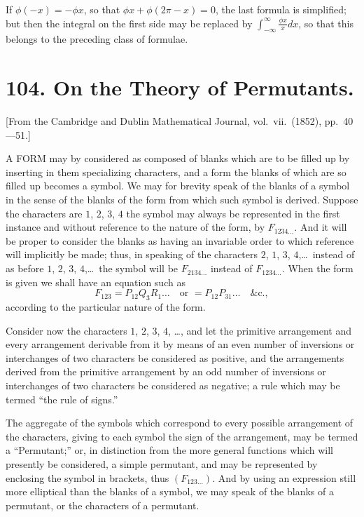 \documentclass[11pt,a4paper]{book}
\begin{document}
If $\phi(-x) = -\phi x$, so that $\phi x + \phi(2\pi - x) = 0$, the last formula is simplified; but then the integral on the first side may be replaced by $\int_{-\infty}^{\infty} \frac{\phi x}{x} dx$, so that this belongs to the preceding class of formulae.
\clearpage


\section*{104. On the Theory of Permutants.}

[From the Cambridge and Dublin Mathematical Journal, vol.\ vii.\ (1852), pp.\ 40---51.]

A FORM may by considered as composed of blanks which are to be filled up by inserting in them specializing characters, and a form the blanks of which are so filled up becomes a symbol. We may for brevity speak of the blanks of a symbol in the sense of the blanks of the form from which such symbol is derived. Suppose the characters are $1$, $2$, $3$, $4$ the symbol may always be represented in the first instance and without reference to the nature of the form, by $F_{1234\ldots}$. And it will be proper to consider the blanks as having an invariable order to which reference will implicitly be made; thus, in speaking of the characters $2$, $1$, $3$, $4$,\ldots\ instead of as before $1$, $2$, $3$, $4$,\ldots\ the symbol will be $F_{2134\ldots}$ instead of $F_{1234\ldots}$. When the form is given we shall have an equation such as
\[F_{123} = P_{12} Q_3 R_1 \ldots \quad \text{or } = P_{12} P_{31} \ldots \quad \&\text{c.},\]
according to the particular nature of the form.

Consider now the characters $1$, $2$, $3$, $4$, \ldots, and let the primitive arrangement and every arrangement derivable from it by means of an even number of inversions or interchanges of two characters be considered as positive, and the arrangements derived from the primitive arrangement by an odd number of inversions or interchanges of two characters be considered as negative; a rule which may be termed ``the rule of signs.''

The aggregate of the symbols which correspond to every possible arrangement of the characters, giving to each symbol the sign of the arrangement, may be termed a ``Permutant;'' or, in distinction from the more general functions which will presently be considered, a simple permutant, and may be represented by enclosing the symbol in brackets, thus $(F_{123\ldots})$. And by using an expression still more elliptical than the blanks of a symbol, we may speak of the blanks of a permutant, or the characters of a permutant.
\end{document}
